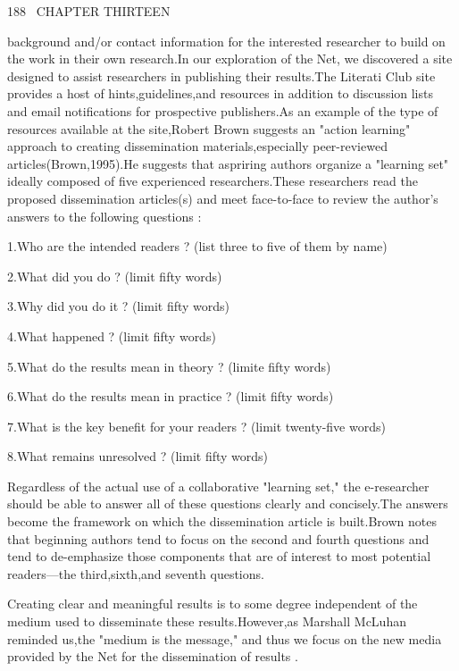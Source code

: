 \documentclass[10pt,a4paper]{book}
\begin{document}
\small

\begin{flushleft}
  188 \, CHAPTER THIRTEEN
\end{flushleft}

background and/or contact information for the interested researcher to build on the work in their own research.In our exploration of the Net, we discovered a site designed to assist researchers in publishing their results.The Literati Club site provides a host of hints,guidelines,and resources in addition to discussion lists and email notifications for prospective publishers.As an example of the type of resources available at the site,Robert Brown suggests an "action learning" approach to creating dissemination materials,especially peer-reviewed articles(Brown,1995).He suggests that aspriring authors organize a "learning set" ideally composed of five experienced researchers.These researchers read the proposed dissemination articles(s) and meet face-to-face to review the author's answers to the following questions :


\begin{flushleft}
  \qquad 1.Who are the intended readers ? (list three to five of them by name)

  \qquad 2.What did you do ? (limit fifty words)

  \qquad 3.Why did you do it ? (limit fifty words)

  \qquad 4.What happened ? (limit fifty words)

  \qquad 5.What do the results mean in theory ? (limite fifty words)

  \qquad 6.What do the results mean in practice ? (limit fifty words)

  \qquad 7.What is the key benefit for your readers ? (limit twenty-five words)

  \qquad 8.What remains unresolved ? (limit fifty words)

\end{flushleft}


Regardless of the actual use of a collaborative "learning set," the e-researcher should be able to answer all of these questions clearly and concisely.The answers become the framework on which the dissemination article is built.Brown notes that beginning authors tend to focus on the second and fourth questions and tend to de-emphasize those components that are of interest to most potential readers---the third,sixth,and seventh questions.

Creating clear and meaningful results is to some degree independent of the medium used to disseminate these results.However,as Marshall McLuhan reminded us,the "medium is the message," and thus we focus on the new media provided by the Net for the dissemination of results .
\end{document}
